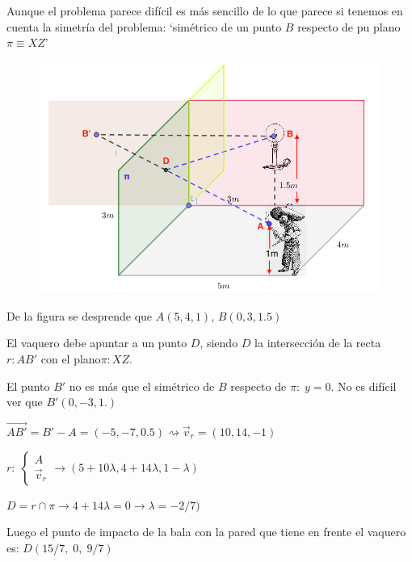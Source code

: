 \begin{proofw}\renewcommand{\qedsymbol}{$\diamond$}	
\noindent Aunque el problema parece difícil es más sencillo de lo que parece si tenemos en cuenta la simetría del problema: `simétrico de un punto $B$ respecto de pu plano $\pi\equiv XZ$'

\begin{figure}[H]
		\centering
		\includegraphics[width=.9\textwidth]{imagenes/imagenes11/vaquero-sol.png}
	\end{figure}
	

\noindent De la figura se desprende que $A(5,4,1)$, $B(0,3,1.5)$

\noindent El vaquero debe apuntar a un punto $D$, siendo $D$ la intersección de la recta $r:AB'$ con el plano$\pi:XZ$. 

\noindent El punto $B'$ no es más que el simétrico de $B$ respecto de $\pi: \; y=0$. No es difícil ver que $B'(0,-3,1.)$

\noindent $\overrightarrow{AB'}=B'-A=(-5,-7,0.5) \rightsquigarrow \vec v_r=(10,14,-1)$

\noindent $r:\; \begin{cases} A \\ \vec v_r \end{cases}\to (5+10\lambda, 4+14\lambda,1-\lambda)$

\noindent $D=r\cap \pi \to 4+14\lambda=0 \to \lambda=-2/7)$

\noindent Luego el punto de impacto de la bala con la pared que tiene en frente el vaquero es: $D(15/7,\; 0,\; 9/7)$
	
\end{proofw}


